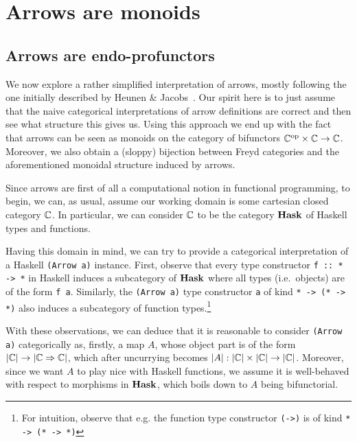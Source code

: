 \section{Arrows are monoids}

\subsection{Arrows are endo-profunctors}


We now explore a rather simplified interpretation of arrows, mostly following
the one initially described by Heunen \& Jacobs~\cite{arr-like-mon}. Our spirit
here is to just assume that the naive categorical interpretations of arrow
definitions are correct and then see what structure this gives us.
Using this approach we end up with the fact that arrows can be seen as monoids
on the category of bifunctors ${\mathbb{C}}^{\text{op}} \times \mathbb{C} \to \mathbb{C}$.
Moreover, we also obtain a (sloppy) bijection between Freyd categories and
the aforementioned monoidal structure induced by arrows.

Since arrows are first of all a computational notion in functional programming,
to begin, we can, as usual, assume our working domain is some cartesian closed
category $\mathbb{C}$. In particular, we can consider $\mathbb{C}$ to be the category
$\mathbf{Hask}$ of Haskell types and functions.

Having this domain in mind, we can try to provide a categorical interpretation
of a Haskell \verb|(Arrow a)| instance. First, observe that every type
constructor \verb|f :: * -> *| in Haskell induces a subcategory of $\mathbf{Hask}$
where all types (i.e.~objects) are of the form \verb|f a|.  Similarly,
the \verb|(Arrow a)| type constructor \verb|a| of kind \verb|* -> (* -> *)|
also induces a subcategory of function types.\footnote{%
For intuition, observe that e.g. the function type constructor
\texttt{(->)} is of kind \texttt{* -> (* -> *)}}

With these observations, we can deduce that it is reasonable to consider
\verb|(Arrow a)| categorically as, firstly, a map $A$, whose object part is
of the form $|\mathbb{C}| \to |\mathbb{C} \Rightarrow \mathbb{C}|$, which after uncurrying
becomes $|A|: |\mathbb{C}| \times |\mathbb{C}| \to |\mathbb{C}|$. Moreover, since we want $A$
to play nice with Haskell functions, we assume it is well-behaved with respect
to morphisms in $\mathbf{Hask}$, which boils down to $A$ being bifunctorial.

